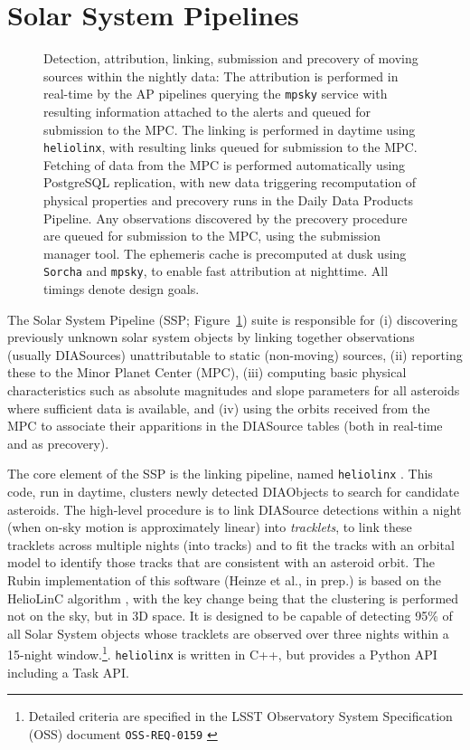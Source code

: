 \section{Solar System Pipelines}
\label{sec:solsys}

\begin{figure}
\begin{center}

\caption{\label{fig:ssp} Detection, attribution, linking, submission and precovery of moving sources within the nightly data: The attribution is performed in real-time by the AP pipelines querying the \texttt{mpsky} service with resulting information attached to the alerts and queued for submission to the MPC.
The linking is performed in daytime using \texttt{heliolinx}, with resulting links queued for submission to the MPC.
Fetching of data from the MPC is performed automatically using PostgreSQL replication, with new data triggering recomputation of physical properties and precovery runs in the Daily Data Products Pipeline.
Any observations discovered by the precovery procedure are queued for submission to the MPC, using the submission manager tool.
The ephemeris cache is precomputed at dusk using \texttt{Sorcha} and \texttt{mpsky}, to enable fast attribution at nighttime.
All timings denote design goals.
}

\end{center}
\end{figure}
The Solar System Pipeline (SSP; Figure~\ref{fig:ssp}) suite is responsible for (i) discovering previously unknown solar system objects by linking together observations (usually DIASources) unattributable to static (non-moving) sources, (ii) reporting these to the Minor Planet Center (MPC), (iii) computing basic physical characteristics such as absolute magnitudes and slope parameters for all asteroids where sufficient data is available, and (iv) using the orbits received from the MPC to associate their apparitions in the DIASource tables (both in real-time and as precovery).

The core element of the SSP is the linking pipeline, named \texttt{heliolinx} \citep{heliolinx}.
This code, run in daytime, clusters newly detected DIAObjects to search for candidate asteroids.
The high-level procedure is to link DIASource detections within a night (when on-sky motion is approximately linear) into {\em tracklets}, to link these tracklets across multiple nights (into tracks) and to fit the tracks with an orbital model to identify those tracks that are consistent with an asteroid orbit.
The Rubin implementation of this software (Heinze et al., in prep.) is based on the HelioLinC algorithm \citep{2018AJ....156..135H}, with the key change being that the clustering is performed not on the sky, but in 3D space.
It is designed to be capable of detecting 95\% of all Solar System objects whose tracklets are observed over three nights within a 15-night window.\footnote{Detailed criteria are specified in the LSST Observatory System Specification (OSS) document \texttt{OSS-REQ-0159} \citep{LSE-30}}.
\texttt{heliolinx} is written in C++, but provides a Python API including a Task API.

